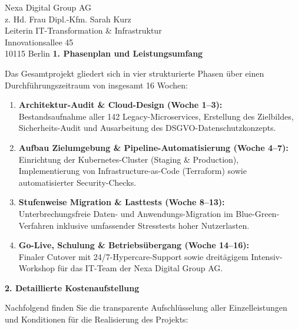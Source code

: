 \documentclass[11pt,a4paper]{dinbrief}
\begin{document}
\begin{letter}{%
  Nexa Digital Group AG\\
  z. Hd. Frau Dipl.-Kfm. Sarah Kurz\\
  Leiterin IT-Transformation \& Infrastruktur\\
  Innovationsallee 45\\
  10115 Berlin
}
\vspace{0.3cm}
\textcolor{navyprimary}{\large\textbf{1. Phasenplan und Leistungsumfang}}

Das Gesamtprojekt gliedert sich in vier strukturierte Phasen über einen Durchführungszeitraum von insgesamt 16 Wochen:

\begin{enumerate}[leftmargin=1.8em,itemsep=3pt,parsep=0pt,label=\textcolor{navyprimary}{\textbf{Phase \arabic*:}}]
  \item \textbf{Architektur-Audit \& Cloud-Design (Woche 1--3):}\\%
    Bestandsaufnahme aller 142 Legacy-Microservices, Erstellung des Zielbildes, Sicherheits-Audit und Ausarbeitung des DSGVO-Datenschutzkonzepts.
  \item \textbf{Aufbau Zielumgebung \& Pipeline-Automatisierung (Woche 4--7):}\\%
    Einrichtung der Kubernetes-Cluster (Staging \& Production), Implementierung von Infrastructure-as-Code (Terraform) sowie automatisierter Security-Checks.
  \item \textbf{Stufenweise Migration \& Lasttests (Woche 8--13):}\\%
    Unterbrechungsfreie Daten- und Anwendungs-Migration im Blue-Green-Verfahren inklusive umfassender Stresstests hoher Nutzerlasten.
  \item \textbf{Go-Live, Schulung \& Betriebsübergang (Woche 14--16):}\\%
    Finaler Cutover mit 24/7-Hypercare-Support sowie dreitägigem Intensiv-Workshop für das IT-Team der Nexa Digital Group AG.
\end{enumerate}

\vspace{0.3cm}
\textcolor{navyprimary}{\large\textbf{2. Detaillierte Kostenaufstellung}}

Nachfolgend finden Sie die transparente Aufschlüsselung aller Einzelleistungen und Konditionen für die Realisierung des Projekts:


\end{letter}
\end{document}
